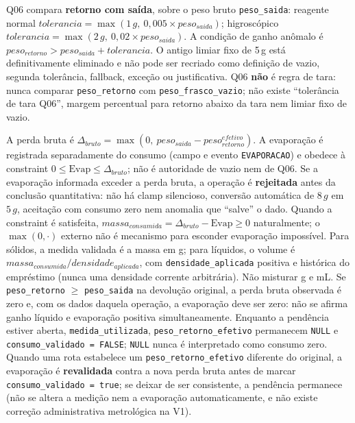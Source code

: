 \begin{regra}
Q06 compara \textbf{retorno com saída}, sobre o peso bruto \texttt{peso\_saida}: reagente normal $tolerancia = \max(1\,g,\ 0{,}005 \times peso_{saida})$; higroscópico $tolerancia = \max(2\,g,\ 0{,}02 \times peso_{saida})$. A condição de ganho anômalo é $peso_{retorno} > peso_{saida} + tolerancia$. O antigo limiar fixo de 5\,g está definitivamente eliminado e não pode ser recriado como definição de vazio, segunda tolerância, fallback, exceção ou justificativa. Q06 \textbf{não} é regra de tara: nunca comparar \texttt{peso\_retorno} com \texttt{peso\_frasco\_vazio}; não existe ``tolerância de tara Q06'', margem percentual para retorno abaixo da tara nem limiar fixo de vazio.
\end{regra}

\begin{regra}
A perda bruta é $\Delta_{bruto} = \max(0,\ peso_{saida} - peso_{retorno}^{efetivo})$. A evaporação é registrada separadamente do consumo (campo e evento \texttt{EVAPORACAO}) e obedece à constraint $0 \le \text{Evap} \le \Delta_{bruto}$; não é autoridade de vazio nem de Q06. Se a evaporação informada exceder a perda bruta, a operação é \textbf{rejeitada} antes da conclusão quantitativa: não há clamp silencioso, conversão automática de $8\,g$ em $5\,g$, aceitação com consumo zero nem anomalia que “salve” o dado. Quando a constraint é satisfeita, $massa_{consumida} = \Delta_{bruto} - \text{Evap} \ge 0$ naturalmente; o $\max(0,\cdot)$ externo não é mecanismo para esconder evaporação impossível. Para sólidos, a medida validada é a massa em g; para líquidos, o volume é $massa_{consumida} / densidade_{aplicada}$, com \texttt{densidade\_aplicada} positiva e histórica do empréstimo (nunca uma densidade corrente arbitrária). Não misturar g e mL. Se \texttt{peso\_retorno} $\ge$ \texttt{peso\_saida} na devolução original, a perda bruta observada é zero e, com os dados daquela operação, a evaporação deve ser zero: não se afirma ganho líquido e evaporação positiva simultaneamente. Enquanto a pendência estiver aberta, \texttt{medida\_utilizada}, \texttt{peso\_retorno\_efetivo} permanecem \texttt{NULL} e \texttt{consumo\_validado = FALSE}; \texttt{NULL} nunca é interpretado como consumo zero. Quando uma rota estabelece um \texttt{peso\_retorno\_efetivo} diferente do original, a evaporação é \textbf{revalidada} contra a nova perda bruta antes de marcar \texttt{consumo\_validado = true}; se deixar de ser consistente, a pendência permanece (não se altera a medição nem a evaporação automaticamente, e não existe correção administrativa metrológica na V1).
\end{regra}

